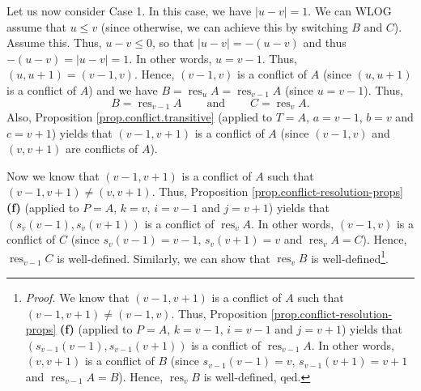 \documentclass[numbers=enddot,12pt,final,onecolumn,notitlepage]{scrartcl}%
\theoremstyle{definition}
\begin{document}
Let us now consider Case 1. In this case, we have $\left\vert u-v\right\vert
=1$. We can WLOG assume that $u\leq v$ (since otherwise, we can achieve this
by switching $B$ and $C$). Assume this. Thus, $u-v\leq0$, so that $\left\vert
u-v\right\vert =-\left(  u-v\right)  $ and thus $-\left(  u-v\right)
=\left\vert u-v\right\vert =1$. In other words, $u=v-1$. Thus, $\left(
u,u+1\right)  =\left(  v-1,v\right)  $. Hence, $\left(  v-1,v\right)  $ is a
conflict of $A$ (since $\left(  u,u+1\right)  $ is a conflict of $A$) and we
have $B=\operatorname*{res}\nolimits_{u}A=\operatorname*{res}\nolimits_{v-1}A$
(since $u=v-1$). Thus,%
\[
B=\operatorname*{res}\nolimits_{v-1}A\ \ \ \ \ \ \ \ \ \ \text{and}%
\ \ \ \ \ \ \ \ \ \ C=\operatorname*{res}\nolimits_{v}A.
\]
Also, Proposition \ref{prop.conflict.transitive} (applied to $T=A$, $a=v-1$,
$b=v$ and $c=v+1$) yields that $\left(  v-1,v+1\right)  $ is a conflict of $A$
(since $\left(  v-1,v\right)  $ and $\left(  v,v+1\right)  $ are conflicts of
$A$).

Now we know that $\left(  v-1,v+1\right)  $ is a conflict of $A$ such that
$\left(  v-1,v+1\right)  \neq\left(  v,v+1\right)  $. Thus, Proposition
\ref{prop.conflict-resolution-props} \textbf{(f)} (applied to $P=A$, $k=v$,
$i=v-1$ and $j=v+1$) yields that $\left(  s_{v}\left(  v-1\right)
,s_{v}\left(  v+1\right)  \right)  $ is a conflict of $\operatorname*{res}%
\nolimits_{v}A$. In other words, $\left(  v-1,v\right)  $ is a conflict of $C$
(since $s_{v}\left(  v-1\right)  =v-1$, $s_{v}\left(  v+1\right)  =v$ and
$\operatorname*{res}\nolimits_{v}A=C$). Hence, $\operatorname*{res}%
\nolimits_{v-1}C$ is well-defined. Similarly, we can show that
$\operatorname*{res}\nolimits_{v}B$ is well-defined\footnote{\textit{Proof.}
We know that $\left(  v-1,v+1\right)  $ is a conflict of $A$ such that
$\left(  v-1,v+1\right)  \neq\left(  v-1,v\right)  $. Thus, Proposition
\ref{prop.conflict-resolution-props} \textbf{(f)} (applied to $P=A$, $k=v-1$,
$i=v-1$ and $j=v+1$) yields that $\left(  s_{v-1}\left(  v-1\right)
,s_{v-1}\left(  v+1\right)  \right)  $ is a conflict of $\operatorname*{res}%
\nolimits_{v-1}A$. In other words, $\left(  v,v+1\right)  $ is a conflict of
$B$ (since $s_{v-1}\left(  v-1\right)  =v$, $s_{v-1}\left(  v+1\right)  =v+1$
and $\operatorname*{res}\nolimits_{v-1}A=B$). Hence, $\operatorname*{res}%
\nolimits_{v}B$ is well-defined, qed.}.
\end{document}
